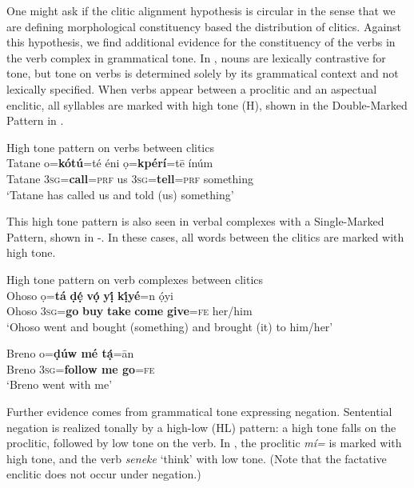 \documentclass[output=paper]{langsci/langscibook}
\begin{document}
One might ask if the clitic alignment hypothesis is circular in the sense that we are defining morphological constituency based the distribution of clitics. Against this hypothesis, we find additional evidence for the constituency of the verbs in the verb complex in grammatical tone. In , nouns are lexically contrastive for tone, but tone on verbs is determined solely by its grammatical context and not lexically specified. When verbs appear between a proclitic and an aspectual enclitic, all syllables are marked with high tone (H), shown in the Double-Marked Pattern in .

\ea\label{ex:rolle:49}
{High tone pattern on verbs between clitics}\\
\gll  Tatane  o=\textbf{kótú}=té     éni   ọ=\textbf{kpérí}=tē     ínúm\\
     Tatane  3\textsc{sg}=\textbf{call}=\textsc{prf}   us   3\textsc{sg}=\textbf{tell}=\textsc{prf}  something\\
\glt ‘Tatane has called us and told (us) something’ \citep[285]{Kari2003a} 
\z

This high tone pattern is also seen in verbal complexes with a Single-Marked Pattern, shown in -. In these cases, all words between the clitics are marked with high tone. 


\ea\label{ex:rolle:ht}
{High tone pattern on verb complexes between clitics} \\
\ea\label{ex:rolle:50}
\gll   Ohoso   ọ=\textbf{tá}  \textbf{ḍẹ́ } \textbf{vọ́  } \textbf{ y\'ị } \textbf{k\'ịyé}=n   \'ọyi\\
     Ohoso    \textsc{3sg}=\textbf{go}  \textbf{buy}  \textbf{take}  \textbf{come}  \textbf{give}=\textsc{fe}   her/him\\
\glt ‘Ohoso went and bought (something) and brought (it) to him/her’ \citep[121]{Kari2004}

\ex\label{ex:rolle:51}
\gll   Breno   o=\textbf{ḍúw    mé   tạ́}=ān\\
     Breno   3\textsc{sg}=\textbf{follow  me   go}=\textsc{fe}\\
\glt ‘Breno went with me’ \citep[115]{Kari2004}
\z
\z 

Further evidence comes from grammatical tone expressing negation. Sentential negation is realized tonally by a high-low (HL) pattern: a high tone falls on the proclitic, followed by low tone on the verb. In , the proclitic \textit{mí=} is marked with high tone, and the verb \textit{seneke} ‘think’ with low tone. (Note that the factative enclitic does not occur under negation.)
\end{document}
